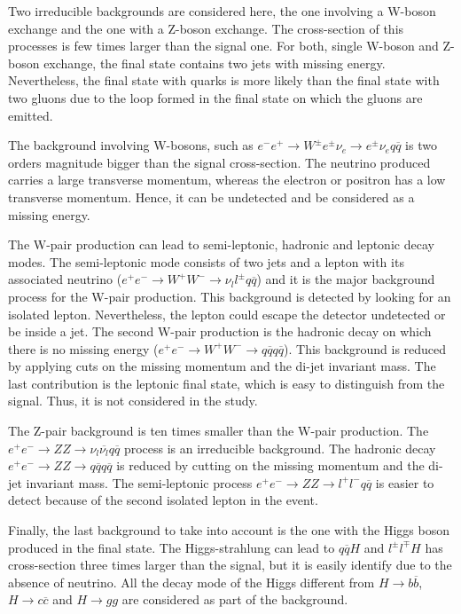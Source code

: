     Two irreducible backgrounds are considered here, the one involving a W-boson exchange and the one with a Z-boson exchange.
    The cross-section of this processes is few times larger than the signal one.
    For both, single W-boson and Z-boson exchange, the final state contains two jets with missing energy.
    Nevertheless, the final state with quarks is more likely than the final state with two gluons due to the loop formed in the final state on which the gluons are emitted.

    The background involving W-bosons, such as $e^{-}e^{+} \rightarrow W^{\pm}e^{\pm}\nu_{e} \rightarrow e^{\pm}\nu_{e}q\overline{q}$ is two orders magnitude bigger than the signal cross-section.
    The neutrino produced carries a large transverse momentum, whereas the electron or positron has a low transverse momentum.
    Hence, it can be undetected and be considered as a missing energy.
    
    The W-pair production can lead to semi-leptonic, hadronic and leptonic decay modes.
    The semi-leptonic mode consists of two jets and a lepton with its associated neutrino ($e^{+}e^{-} \rightarrow W^+W^- \rightarrow \nu_{l}l^{\pm}q\overline{q}$) and it is the major background process for the W-pair production.
    This background is detected by looking for an isolated lepton.
    Nevertheless, the lepton could escape the detector undetected or be inside a jet.
    The second W-pair production is the hadronic decay on which there is no missing energy ($e^{+}e^{-} \rightarrow W^+W^- \rightarrow q\overline{q} q\overline{q}$).
    This background is reduced by applying cuts on the missing momentum and the di-jet invariant mass.
    The last contribution is the leptonic final state, which is easy to distinguish from the signal.
    Thus, it is not considered in the study. 

    The Z-pair background is ten times smaller than the W-pair production.
    The  $e^+e^- \rightarrow ZZ \rightarrow \nu_{l}\overline{\nu_{l}}q \overline{q}$ process is an irreducible background.
    The hadronic decay $e^+e^- \rightarrow ZZ \rightarrow q\overline{q} q\overline{q}$ is reduced by cutting on the missing momentum and the di-jet invariant mass.
    The semi-leptonic process $e^+e^- \rightarrow ZZ \rightarrow l^+l^- q\overline{q}$ is easier to detect because of the second isolated lepton in the event.

    Finally, the last background to take into account is the one with the Higgs boson produced in the final state.
    The Higgs-strahlung can lead to $q\overline{q}H$ and $l^{\pm}l^{\mp}H$ has cross-section three times larger than the signal, but it is easily identify due to the absence of neutrino.
    All the decay mode of the Higgs different from $H \rightarrow b\overline{b}$, $H \rightarrow c\overline{c}$ and $H \rightarrow gg$ are considered as part of the background.

